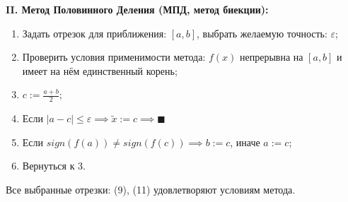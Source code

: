 {\large\bf{II. Метод  Половинного Деления (МПД, метод биекции):}}
\begin{enumerate}
    \item Задать отрезок для приближения: $[a, b]$, выбрать желаемую точность: $\varepsilon$;
    \item Проверить условия применимости метода: $f(x)$ непрерывна на $[a, b]$ и имеет на нём единственный корень;
    \item $c:=\frac{a+b}{2};$
    \item Если $|a-c|\le\varepsilon\implies \widetilde{x}:=c\implies\blacksquare$
    \item Если $sign(f(a)) \ne sign(f(c))\implies b:=c$, иначе $a:=c$;
    \item Вернуться к 3.
\end{enumerate}
Все выбранные отрезки: (9), (11) удовлетворяют условиям метода.\\

